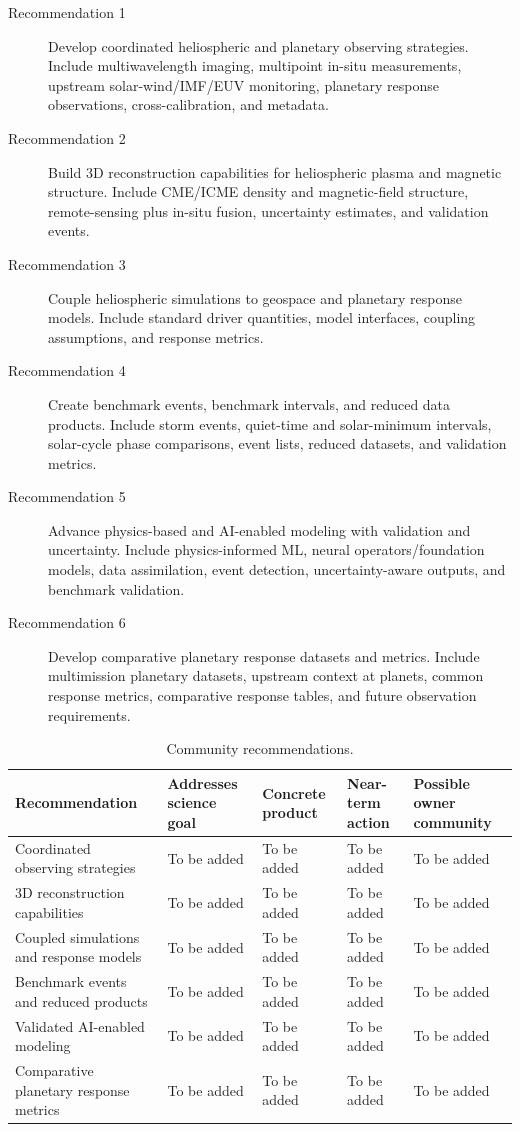 \documentclass[
  draft
]{agujournal2025}
\begin{document}
\begin{description}
\item[Recommendation 1] Develop coordinated heliospheric and planetary observing strategies. Include multiwavelength imaging, multipoint in-situ measurements, upstream solar-wind/IMF/EUV monitoring, planetary response observations, cross-calibration, and metadata.
\item[Recommendation 2] Build 3D reconstruction capabilities for heliospheric plasma and magnetic structure. Include CME/ICME density and magnetic-field structure, remote-sensing plus in-situ fusion, uncertainty estimates, and validation events.
\item[Recommendation 3] Couple heliospheric simulations to geospace and planetary response models. Include standard driver quantities, model interfaces, coupling assumptions, and response metrics.
\item[Recommendation 4] Create benchmark events, benchmark intervals, and reduced data products. Include storm events, quiet-time and solar-minimum intervals, solar-cycle phase comparisons, event lists, reduced datasets, and validation metrics.
\item[Recommendation 5] Advance physics-based and AI-enabled modeling with validation and uncertainty. Include physics-informed ML, neural operators/foundation models, data assimilation, event detection, uncertainty-aware outputs, and benchmark validation.
\item[Recommendation 6] Develop comparative planetary response datasets and metrics. Include multimission planetary datasets, upstream context at planets, common response metrics, comparative response tables, and future observation requirements.
\end{description}

\begin{table}[h]
\caption{Community recommendations.}
\label{tab:community-recommendations}
\centering
\begin{tabular}{p{} p{} p{} p{} p{}}
\hline
Recommendation & Addresses science goal & Concrete product & Near-term action & Possible owner community \\
\hline
Coordinated observing strategies & To be added & To be added & To be added & To be added \\
3D reconstruction capabilities & To be added & To be added & To be added & To be added \\
Coupled simulations and response models & To be added & To be added & To be added & To be added \\
Benchmark events and reduced products & To be added & To be added & To be added & To be added \\
Validated AI-enabled modeling & To be added & To be added & To be added & To be added \\
Comparative planetary response metrics & To be added & To be added & To be added & To be added \\
\hline
\end{tabular}
\end{table}
\end{document}
